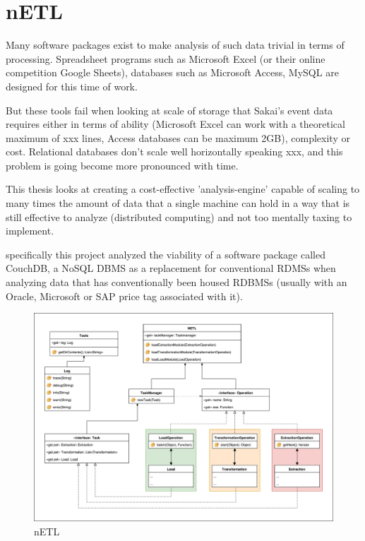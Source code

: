 \section{nETL}
Many software packages exist to make analysis of such data trivial in terms of processing. Spreadsheet programs such as Microsoft Excel (or their online competition Google Sheets), databases such as Microsoft Access, MySQL are designed for this time of work.

But these tools fail when looking at scale of storage that Sakai's event data requires either in terms of ability (Microsoft Excel can work with a theoretical maximum of xxx lines, Access databases can be maximum 2GB), complexity or cost. Relational databases don't scale well horizontally speaking xxx, and this problem is going become more pronounced with time.

This thesis looks at creating a cost-effective 'analysis-engine' capable of scaling to many times the amount of data that a single machine can hold in a way that is still effective to analyze (distributed computing) and not too mentally taxing to implement.

specifically this project analyzed the viability of a software package called CouchDB, a NoSQL DBMS as a replacement for conventional RDMSs when analyzing data that has conventionally been housed RDBMSs (usually with an Oracle, Microsoft or SAP price tag associated with it).

\begin{figure}[h]
    \centering
    \includegraphics[scale=0.4]{./resources/figures/netlUML.pdf}
    \caption[nETL]{nETL}
    \label{nETL}
\end{figure}

